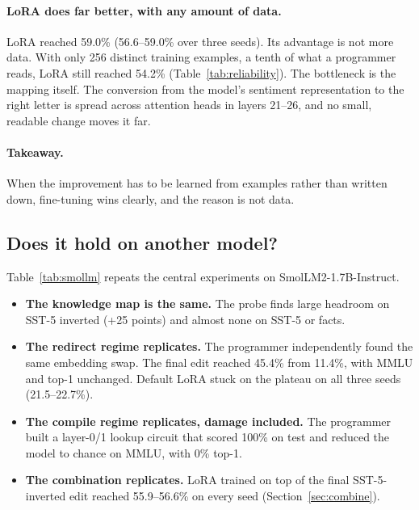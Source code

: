 \paragraph{LoRA does far better, with any amount of data.} LoRA reached 59.0\% (56.6--59.0\% over three seeds). Its advantage is not more data. With only 256 distinct training examples, a tenth of what a programmer reads, LoRA still reached 54.2\% (Table~\ref{tab:reliability}). The bottleneck is the mapping itself. The conversion from the model's sentiment representation to the right letter is spread across attention heads in layers 21--26, and no small, readable change moves it far.

\paragraph{Takeaway.} When the improvement has to be learned from examples rather than written down, fine-tuning wins clearly, and the reason is not data.

\subsection{Does it hold on another model?}
\label{sec:smollm}
Table~\ref{tab:smollm} repeats the central experiments on SmolLM2-1.7B-Instruct.
\begin{itemize}
  \item \textbf{The knowledge map is the same.} The probe finds large headroom on SST-5 inverted (+25 points) and almost none on SST-5 or facts.
  \item \textbf{The redirect regime replicates.} The programmer independently found the same embedding swap. The final edit reached 45.4\% from 11.4\%, with MMLU and top-1 unchanged. Default LoRA stuck on the plateau on all three seeds (21.5--22.7\%).
  \item \textbf{The compile regime replicates, damage included.} The programmer built a layer-0/1 lookup circuit that scored 100\% on test and reduced the model to chance on MMLU, with 0\% top-1.
  \item \textbf{The combination replicates.} LoRA trained on top of the final SST-5-inverted edit reached 55.9--56.6\% on every seed (Section~\ref{sec:combine}).
\end{itemize}

\begin{table}[t]
\centering\small

\caption{The second model family: SmolLM2-1.7B-Instruct (test accuracy, \%). MMLU and top-1 are general-ability measures as in Table~\ref{tab:side} (unedited: 48.8 and 46.0). The final SST-5-inverted edit adds a label-free letter-bias correction and a temperature to the embedding swap. For LoRA on top of it, MMLU and top-1 are ranges over the three seeds.}
\label{tab:smollm}
\end{table}

